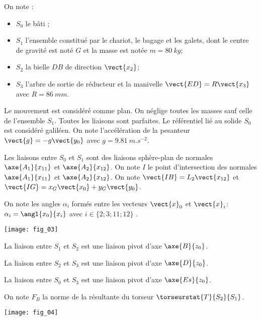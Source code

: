 On note :
\begin{itemize}
\item $S_0$ le bâti ;
\item $S_1$ l’ensemble constitué par le chariot, le bagage et les galets, dont le centre de gravité est noté $G$ et la masse est notée $m=\SI{80}{kg}$;
\item $S_2$ la bielle $DB$ de direction $\vect{x_2}$;
\item $S_3$ l’arbre de sortie de réducteur et la manivelle $\vect{ED}=R\vect{x_3}$ avec $R=\SI{86}{mm}$.
\end{itemize}
Le mouvement est considéré comme plan. On néglige toutes les masses sauf celle de l’ensemble $S_1$. Toutes les liaisons sont parfaites. Le référentiel lié au solide $S_0$ est considéré galiléen. On note l’accélération de la pesanteur $\vect{g}=-g\vect{y_0}$ avec $g=\SI{9,81}{m.s^{-2}}$.

Les liaisons entre $S_0$ et $S_1$ sont des liaisons sphère-plan de normales $\axe{A_1}{{x}_{11}}$ et $\axe{A_2}{{x}_{12}}$.
On note $I$ le point d’intersection des normales $\axe{A_1}{{x}_{11}}$ et $\axe{A_2}{{x}_{12}}$. On note $\vect{IB}=L_2\vect{x_{12}}$ et $\vect{IG}=x_G\vect{x_{0}}+y_G\vect{y_{0}}$.

On note les angles $\alpha_i$ formés entre les vecteurs $\vect{x}_0$ et $\vect{x}_i$: $\alpha_i=\angl{{x}_0}{{x}_i}$ avec $i\in \{2;3;11;12\}$ .


\begin{center}
\texttt{[image: fig\_03]}
\end{center}

La liaison entre $S_1$ et $S_2$ est une liaison pivot d’axe $\axe{B}{z_0}$.

La liaison entre $S_2$ et $S_3$ est une liaison pivot d’axe $\axe{D}{z_0}$.

La liaison entre $S_0$ et $S_3$ est une liaison pivot d’axe $\axe{Es}{z_0}$.

\ifnormal
\else
On note $F_B$ la norme de la résultante du torseur $\torseurstat{T}{S_2}{S_1}$. 
\fi

\begin{center}
\texttt{[image: fig\_04]}
\end{center}
\fi


\ifnormal
{}
\else
\fi


